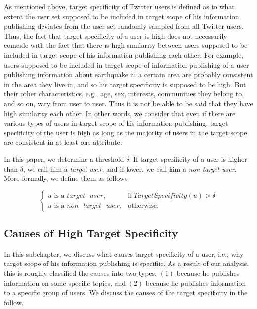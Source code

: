 As mentioned above, target specificity of Twitter users is defined
as to what extent the user set supposed to be included in target scope
of his information publishing deviates from the user set randomly
sampled from all Twitter users.  Thus, the fact that target
specificity of a user is high does not necessarily coincide with the
fact that there is high similarity between users supposed to
be included in target scope of his information publishing each
other.  For example, users supposed to be included in target scope of
information publishing of a user publishing information about
earthquake in a certain area are probably consistent in the area they live in,
and so his target specificity is supposed to be high.  But their
other characteristics, e.g., age, sex, interests, communities they
belong to, and so on, vary from user to user.  Thus it is not be able to
be said that they have high similarity each other.  In other words, we
consider that even
if there are various types of users in target scope of his
information publishing, target specificity of the
user is high as long as the majority of users in the target scope are
consistent in at least one attribute.

In this paper, we determine a threshold $\delta$. If target
specificity of a user is higher than $\delta$, we call him a
\emph{target user}, and if lower, we call him a \emph{non target
user}.  More formally, we define them as follows:

\vspace{-1ex}
\[
  \begin{cases}
   u\mbox{ is a } target\mbox{ }user, & \mbox{if}\
   \mathit{TargetSpecificity}(u) > \delta \\
   u\mbox{ is a }non\mbox{ }target\mbox{ }user, & \mbox{otherwise}.
  \end{cases}
\]
\vspace{-2ex}

\subsection{Causes of High Target Specificity}
\label{subsec:The Causes}

In this subchapter, we discuss what causes target specificity of a
user, i.e., why target scope of his information publishing is
specifiic.  As a result of our analysis, this is roughly classified the
causes into two types: $(1)$ because he publishes information on some specific
topics, and $(2)$ because he publishes information to a specific group
of users.  We discuss the causes of the target specificity in the follow.

